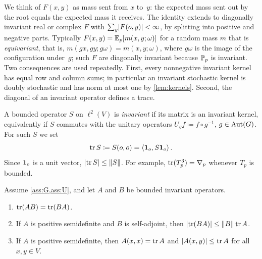 We think of $F(x,y)$ as mass sent from $x$ to~$y$: the expected mass sent out by the root equals the
expected mass it receives. The identity extends to diagonally invariant real or complex $F$ with
$\sum_y\lvert F(o,y)\rvert<\infty$, by splitting into positive and negative parts. Typically
$F(x,y)=\mathbb E_p[m(x,y;\omega)]$ for a random mass $m$ that is \emph{equivariant}, that is,
$m(gx,gy;g\omega)=m(x,y;\omega)$, where $g\omega$ is the image of the configuration under~$g$; such
$F$ are diagonally invariant because $\mathbb P_p$ is invariant. Two consequences are used repeatedly.
First, every nonnegative invariant kernel has equal row and column sums; in particular an invariant
stochastic kernel is doubly stochastic and has norm at most one by \cref{lem:kernels}. Second, the
diagonal of an invariant operator defines a trace.

A bounded operator $S$ on $\ell^2(V)$ is \emph{invariant} if its matrix is an invariant kernel,
equivalently if $S$ commutes with the unitary operators $U_gf\coloneqq f\circ g^{-1}$, $g\in\operatorname{Aut}(G)$.
For such $S$ we set
\begin{equation*}
  \operatorname{tr} S\coloneqq S(o,o)=\langle\mathbf{1}_o,S\mathbf{1}_o\rangle\,.
\end{equation*}
Since $\mathbf{1}_o$ is a unit vector, $\lvert\operatorname{tr} S\rvert\le\lVert S\rVert$. For example, $\operatorname{tr}(T_p^3)=\nabla_p$ whenever
$T_p$ is bounded.

\begin{lemma}\label{lem:trace}
Assume \cref{ass:G,ass:U}, and let $A$ and $B$ be bounded invariant operators.
\begin{enumerate}[label=\textup{(\alph*)}]
  \item\label{it:trace-cyclic} $\operatorname{tr}(AB)=\operatorname{tr}(BA)$.
  \item\label{it:trace-positive} If $A$ is positive semidefinite and $B$ is self-adjoint, then
  $\lvert\operatorname{tr}(BA)\rvert\le\lVert B\rVert\operatorname{tr} A$.
  \item\label{it:trace-diagonal} If $A$ is positive semidefinite, then $A(x,x)=\operatorname{tr} A$ and
  $\lvert A(x,y)\rvert\le\operatorname{tr} A$ for all $x,y\in V$.
\end{enumerate}
\end{lemma}

